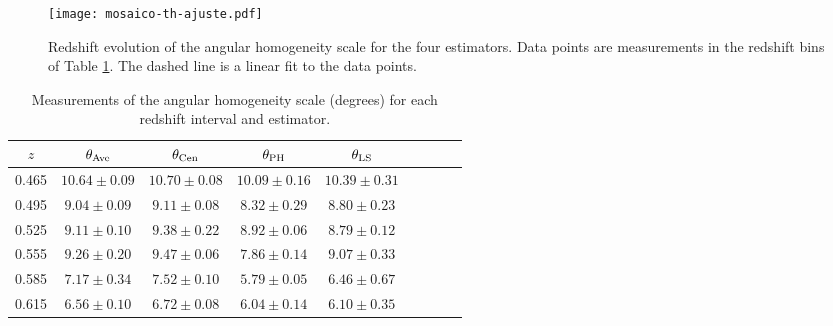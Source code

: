 \documentclass[useAMS,usenatbib]{mn2e}
\begin{document}

\begin{figure}
\vspace{-0.5cm}
\texttt{[image: mosaico-th-ajuste.pdf]}
\caption{Redshift evolution of the angular homogeneity scale for the four estimators. Data points are measurements in the redshift bins of Table \ref{table2}. The dashed line is a linear fit to the data points.}
\label{fig2}
\end{figure}
\vspace{3.0cm}

\begin{table}
\centering
\begin{tabular}{|c|c|c|c|c|c|c|c|c|}
\hline
$z$ & $\theta_{\rm Ave}$ & $\theta_{\rm Cen}$  & $\theta_{\rm PH}$  & $\theta_{\rm LS}$  \\
\hline
0.465 & $10.64 \pm 0.09$  & $10.70 \pm 0.08$ & $10.09 \pm 0.16$ & $10.39 \pm 0.31$ \\ \hline
0.495 & $9.04  \pm 0.09$  & $9.11  \pm 0.08$ & $8.32  \pm 0.29$ & $8.80  \pm 0.23$ \\ \hline
0.525 & $9.11  \pm 0.10$  & $9.38  \pm 0.22$ & $8.92  \pm 0.06$ & $8.79  \pm 0.12$ \\ \hline
0.555 & $9.26  \pm 0.20$  & $9.47  \pm 0.06$ & $7.86  \pm 0.14$ & $9.07  \pm 0.33$ \\ \hline
0.585 & $7.17  \pm 0.34$  & $7.52  \pm 0.10$ & $5.79  \pm 0.05$ & $6.46  \pm 0.67$ \\ \hline
0.615 & $6.56  \pm 0.10$  & $6.72  \pm 0.08$ & $6.04  \pm 0.14$ & $6.10  \pm 0.35$ \\ \hline
\end{tabular} 
\caption{Measurements of the angular homogeneity scale (degrees) for each redshift interval and estimator.}
\label{table2}
\end{table}
\end{document}
